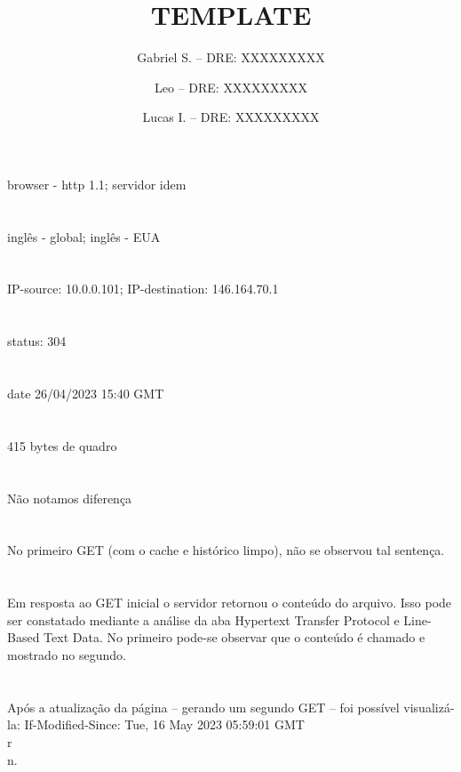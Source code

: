 \documentclass[12pt]{article}
\title{TEMPLATE}
\author{Gabriel S. -- DRE: XXXXXXXXX\\ \and Leo -- DRE: XXXXXXXXX\\ \and Lucas I. -- DRE: XXXXXXXXX}
\begin{document}
 

\maketitle

\section{}
browser - http 1.1; servidor idem
\section{}
inglês - global; inglês - EUA
\section{}
IP-source: 10.0.0.101; IP-destination: 146.164.70.1
\section{}
 status: 304
\section{}
date 26/04/2023 15:40 GMT
\section{}
415 bytes de quadro
\section{}
Não notamos diferença
\section{}
No primeiro GET (com o cache e histórico limpo), não se observou tal sentença.
\section{}
Em resposta ao GET inicial o servidor retornou o conteúdo do arquivo. Isso pode ser constatado mediante a análise da aba Hypertext Transfer Protocol e Line-Based Text Data. No primeiro pode-se observar que o conteúdo é chamado e mostrado no segundo. 
\section{}
Após a atualização da página -- gerando um segundo GET -- foi possível visualizá-la: If-Modified-Since: Tue, 16 May 2023 05:59:01 GMT\\r\\n.
\end{document}
